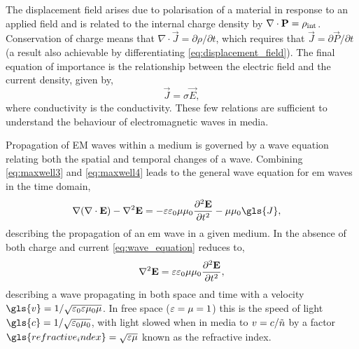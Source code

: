 \documentclass{article}
\begin{document}
The displacement field arises due to polarisation of a material in response to an applied field and is related to the internal charge density by $\nabla\cdot\mathbf{P}=\rho_{\mathrm{int}}$. Conservation of charge means that $\nabla\cdot\vec{J}=\partial\rho/\partial t$, which requires that $\vec{J}=\partial\vec{P}/\partial t$ (a result also achievable by differentiating \eqref{eq:displacement_field}). The final equation of importance is the relationship between the electric field and the current density, given by,
\begin{equation}
	\vec{J} = \sigma\vec{E},
	\label{eq:current_density}
\end{equation}
where \gls{conductivity} is the conductivity. These few relations are sufficient to understand the behaviour of electromagnetic waves in media.

Propagation of EM waves within a medium is governed by a wave equation relating both the spatial and temporal changes of a wave.
Combining \eqref{eq:maxwell3} and \eqref{eq:maxwell4} leads to the general wave equation for \gls{em} waves in the time domain,%
\begin{align}
	\nabla(\nabla\cdot\vec{E}) - \nabla^2\vec{E} &= -\eps\epsfs\mu\mu_0\frac{\partial^2\vec{E}}{\partial t^2} - \mu\mu_0\gls{J},%
	\label{eq:wave_equation}
\end{align}
describing the propagation of an \gls{em} wave in a given medium.
In the absence of both charge and current \eqref{eq:wave_equation} reduces to,
\begin{equation}
	\nabla^2\mathbf{E} = \varepsilon\varepsilon_0\mu\mu_0\frac{\partial^2\mathbf{E}}{\partial t^2},
\end{equation}
describing a wave propagating in both space and time with a velocity $\gls{v}=1/\sqrt{\epsfs\eps\mu_0\mu}$. In free space ($\varepsilon=\mu=1$) this is the speed of light $\gls{c}=1/\sqrt{\epsfs\mu_0}$, with light slowed when in media to $v=c/\tilde{n}$ by a factor $\gls{refractive_index}=\sqrt{\eps\mu}$ known as the refractive index.
\end{document}
